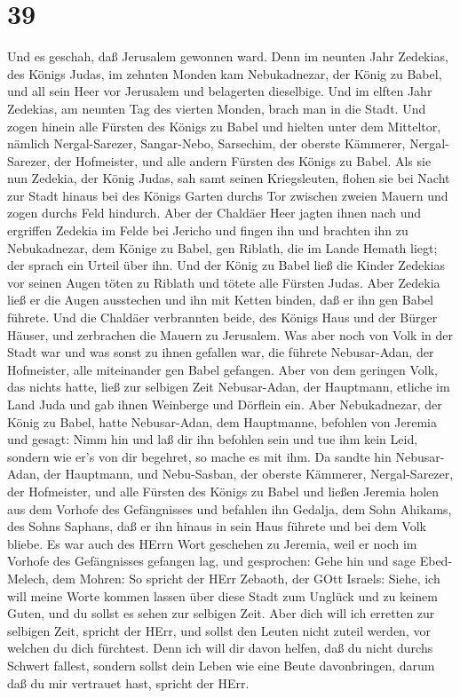 \hypertarget{section-38}{%
\section{39}\label{section-38}}

 Und es geschah, daß Jerusalem gewonnen ward. Denn im
neunten Jahr Zedekias, des Königs Judas, im zehnten Monden kam
Nebukadnezar, der König zu Babel, und all sein Heer vor Jerusalem und
belagerten dieselbige.  Und im elften Jahr Zedekias, am
neunten Tag des vierten Monden, brach man in die Stadt.  Und
zogen hinein alle Fürsten des Königs zu Babel und hielten unter dem
Mitteltor, nämlich Nergal-Sarezer, Sangar-Nebo, Sarsechim, der oberste
Kämmerer, Nergal-Sarezer, der Hofmeister, und alle andern Fürsten des
Königs zu Babel.  Als sie nun Zedekia, der König Judas, sah
samt seinen Kriegsleuten, flohen sie bei Nacht zur Stadt hinaus bei des
Königs Garten durchs Tor zwischen zweien Mauern und zogen durchs Feld
hindurch.  Aber der Chaldäer Heer jagten ihnen nach und
ergriffen Zedekia im Felde bei Jericho und fingen ihn und brachten ihn
zu Nebukadnezar, dem Könige zu Babel, gen Riblath, die im Lande Hemath
liegt; der sprach ein Urteil über ihn.  Und der König zu
Babel ließ die Kinder Zedekias vor seinen Augen töten zu Riblath und
tötete alle Fürsten Judas.  Aber Zedekia ließ er die Augen
ausstechen und ihn mit Ketten binden, daß er ihn gen Babel führete.
 Und die Chaldäer verbrannten beide, des Königs Haus und der
Bürger Häuser, und zerbrachen die Mauern zu Jerusalem.  Was
aber noch von Volk in der Stadt war und was sonst zu ihnen gefallen war,
die führete Nebusar-Adan, der Hofmeister, alle miteinander gen Babel
gefangen.  Aber von dem geringen Volk, das nichts hatte,
ließ zur selbigen Zeit Nebusar-Adan, der Hauptmann, etliche im Land Juda
und gab ihnen Weinberge und Dörflein ein.  Aber
Nebukadnezar, der König zu Babel, hatte Nebusar-Adan, dem Hauptmanne,
befohlen von Jeremia und gesagt:  Nimm hin und laß dir ihn
befohlen sein und tue ihm kein Leid, sondern wie er's von dir begehret,
so mache es mit ihm.  Da sandte hin Nebusar-Adan, der
Hauptmann, und Nebu-Sasban, der oberste Kämmerer, Nergal-Sarezer, der
Hofmeister, und alle Fürsten des Königs zu Babel  und
ließen Jeremia holen aus dem Vorhofe des Gefängnisses und befahlen ihn
Gedalja, dem Sohn Ahikams, des Sohns Saphans, daß er ihn hinaus in sein
Haus führete und bei dem Volk bliebe.  Es war auch des
HErrn Wort geschehen zu Jeremia, weil er noch im Vorhofe des
Gefängnisses gefangen lag, und gesprochen:  Gehe hin und
sage Ebed-Melech, dem Mohren: So spricht der HErr Zebaoth, der GOtt
Israels: Siehe, ich will meine Worte kommen lassen über diese Stadt zum
Unglück und zu keinem Guten, und du sollst es sehen zur selbigen Zeit.
 Aber dich will ich erretten zur selbigen Zeit, spricht der
HErr, und sollst den Leuten nicht zuteil werden, vor welchen du dich
fürchtest.  Denn ich will dir davon helfen, daß du nicht
durchs Schwert fallest, sondern sollst dein Leben wie eine Beute
davonbringen, darum daß du mir vertrauet hast, spricht der HErr.


